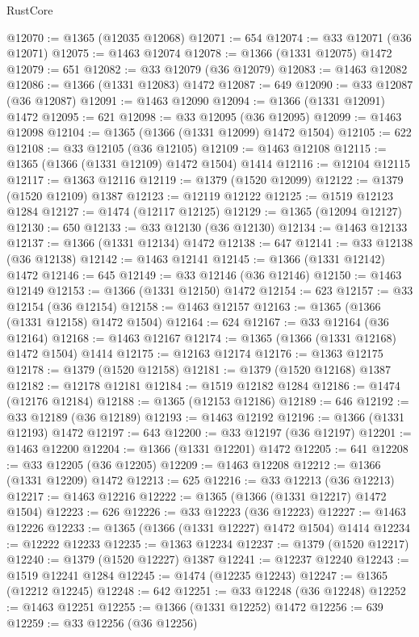 \begin{lexlean}{RustCore}
\begin{coremodule}
@12070 := @1365 (@12035 @12068)
@12071 := 654
@12074 := @33 @12071 (@36 @12071)
@12075 := @1463 @12074
@12078 := @1366 (@1331 @12075) @1472
@12079 := 651
@12082 := @33 @12079 (@36 @12079)
@12083 := @1463 @12082
@12086 := @1366 (@1331 @12083) @1472
@12087 := 649
@12090 := @33 @12087 (@36 @12087)
@12091 := @1463 @12090
@12094 := @1366 (@1331 @12091) @1472
@12095 := 621
@12098 := @33 @12095 (@36 @12095)
@12099 := @1463 @12098
@12104 := @1365 (@1366 (@1331 @12099) @1472 @1504)
@12105 := 622
@12108 := @33 @12105 (@36 @12105)
@12109 := @1463 @12108
@12115 := @1365 (@1366 (@1331 @12109) @1472 @1504) @1414
@12116 := @12104 @12115
@12117 := @1363 @12116
@12119 := @1379 (@1520 @12099)
@12122 := @1379 (@1520 @12109) @1387
@12123 := @12119 @12122
@12125 := @1519 @12123 @1284
@12127 := @1474 (@12117 @12125)
@12129 := @1365 (@12094 @12127)
@12130 := 650
@12133 := @33 @12130 (@36 @12130)
@12134 := @1463 @12133
@12137 := @1366 (@1331 @12134) @1472
@12138 := 647
@12141 := @33 @12138 (@36 @12138)
@12142 := @1463 @12141
@12145 := @1366 (@1331 @12142) @1472
@12146 := 645
@12149 := @33 @12146 (@36 @12146)
@12150 := @1463 @12149
@12153 := @1366 (@1331 @12150) @1472
@12154 := 623
@12157 := @33 @12154 (@36 @12154)
@12158 := @1463 @12157
@12163 := @1365 (@1366 (@1331 @12158) @1472 @1504)
@12164 := 624
@12167 := @33 @12164 (@36 @12164)
@12168 := @1463 @12167
@12174 := @1365 (@1366 (@1331 @12168) @1472 @1504) @1414
@12175 := @12163 @12174
@12176 := @1363 @12175
@12178 := @1379 (@1520 @12158)
@12181 := @1379 (@1520 @12168) @1387
@12182 := @12178 @12181
@12184 := @1519 @12182 @1284
@12186 := @1474 (@12176 @12184)
@12188 := @1365 (@12153 @12186)
@12189 := 646
@12192 := @33 @12189 (@36 @12189)
@12193 := @1463 @12192
@12196 := @1366 (@1331 @12193) @1472
@12197 := 643
@12200 := @33 @12197 (@36 @12197)
@12201 := @1463 @12200
@12204 := @1366 (@1331 @12201) @1472
@12205 := 641
@12208 := @33 @12205 (@36 @12205)
@12209 := @1463 @12208
@12212 := @1366 (@1331 @12209) @1472
@12213 := 625
@12216 := @33 @12213 (@36 @12213)
@12217 := @1463 @12216
@12222 := @1365 (@1366 (@1331 @12217) @1472 @1504)
@12223 := 626
@12226 := @33 @12223 (@36 @12223)
@12227 := @1463 @12226
@12233 := @1365 (@1366 (@1331 @12227) @1472 @1504) @1414
@12234 := @12222 @12233
@12235 := @1363 @12234
@12237 := @1379 (@1520 @12217)
@12240 := @1379 (@1520 @12227) @1387
@12241 := @12237 @12240
@12243 := @1519 @12241 @1284
@12245 := @1474 (@12235 @12243)
@12247 := @1365 (@12212 @12245)
@12248 := 642
@12251 := @33 @12248 (@36 @12248)
@12252 := @1463 @12251
@12255 := @1366 (@1331 @12252) @1472
@12256 := 639
@12259 := @33 @12256 (@36 @12256)

\end{coremodule}
\end{lexlean}
